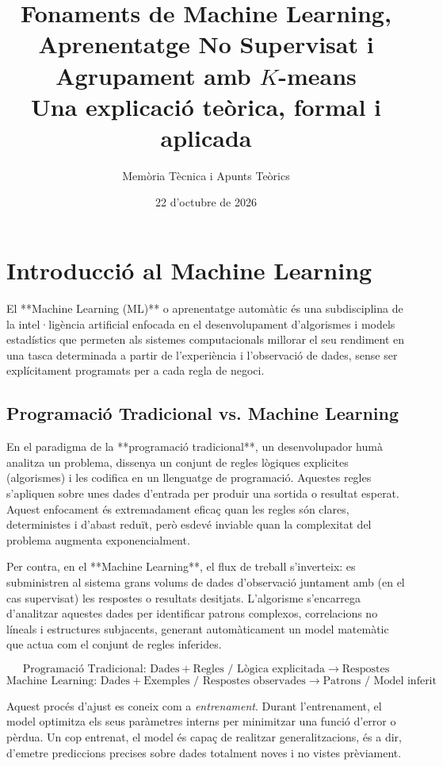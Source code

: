 \documentclass[11pt, a4paper]{article}
\title{\textbf{Fonaments de Machine Learning, Aprenentatge No Supervisat i Agrupament amb $K$-means}\\
\large Una explicació teòrica, formal i aplicada}
\author{Memòria Tècnica i Apunts Teòrics}
\date{22 d'octubre de 2026}
\begin{document}
\maketitle


\section{Introducció al Machine Learning}

El **Machine Learning (ML)** o aprenentatge automàtic és una subdisciplina de la intel·ligència artificial enfocada en el desenvolupament d'algorismes i models estadístics que permeten als sistemes computacionals millorar el seu rendiment en una tasca determinada a partir de l'experiència i l'observació de dades, sense ser explícitament programats per a cada regla de negoci.

\subsection{Programació Tradicional vs. Machine Learning}
En el paradigma de la **programació tradicional**, un desenvolupador humà analitza un problema, dissenya un conjunt de regles lògiques explicites (algorismes) i les codifica en un llenguatge de programació. Aquestes regles s'apliquen sobre unes dades d'entrada per produir una sortida o resultat esperat. Aquest enfocament és extremadament eficaç quan les regles són clares, deterministes i d'abast reduït, però esdevé inviable quan la complexitat del problema augmenta exponencialment.

Per contra, en el **Machine Learning**, el flux de treball s'inverteix: es subministren al sistema grans volums de dades d'observació juntament amb (en el cas supervisat) les respostes o resultats desitjats. L'algorisme s'encarrega d'analitzar aquestes dades per identificar patrons complexos, correlacions no líneals i estructures subjacents, generant automàticament un model matemàtic que actua com el conjunt de regles inferides.

\[
\text{Programació Tradicional: } \text{Dades} + \text{Regles / Lògica explicitada} \longrightarrow \text{Respostes}
\]
\[
\text{Machine Learning: } \text{Dades} + \text{Exemples / Respostes observades} \longrightarrow \text{Patrons / Model inferit}
\]

Aquest procés d'ajust es coneix com a \textit{entrenament}. Durant l'entrenament, el model optimitza els seus paràmetres interns per minimitzar una funció d'error o pèrdua. Un cop entrenat, el model és capaç de realitzar generalitzacions, és a dir, d'emetre prediccions precises sobre dades totalment noves i no vistes prèviament.
\end{document}
